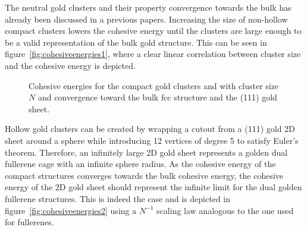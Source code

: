The neutral gold clusters and their property convergence towards the bulk has
already been discussed in a previous
papers.\autocite{Assadollahzadeh_systematicsearchminimum_2009} Increasing the
size of non-hollow compact clusters lowers the cohesive energy until the
clusters are large enough to be a valid representation of the bulk gold
structure. This can be seen in figure~\ref{fig:cohesiveenergies1}, where a
clear linear correlation between cluster size and the cohesive energy is
depicted.
%
\begin{figure}[htb]\centering
    \hfill
	\caption{Cohesive energies for \protect{} the compact gold clusters and \protect{} with cluster size $N$ and \protect{} convergence toward the bulk \acs{fcc} structure and \protect{} the (111) gold sheet.}
\end{figure}
%
Hollow gold clusters can be created by wrapping a cutout from a (111) gold 2D
sheet around a sphere while introducing 12 vertices of degree 5 to satisfy
Euler's theorem. Therefore, an infinitely large 2D gold sheet represents a
golden dual fullerene cage with an infinite sphere radius. As the cohesive
energy of the compact structures converges towards the bulk cohesive energy, the
cohesive energy of the 2D gold sheet should represent the infinite limit for the
dual golden fullerene structures. This is indeed the case and is depicted in
figure~\ref{fig:cohesiveenergies2} using a $N^{-1}$ scaling law analogous to the
one used for fullerenes.\autocite{Wirz_smallfullerenesgraphene_2015}

